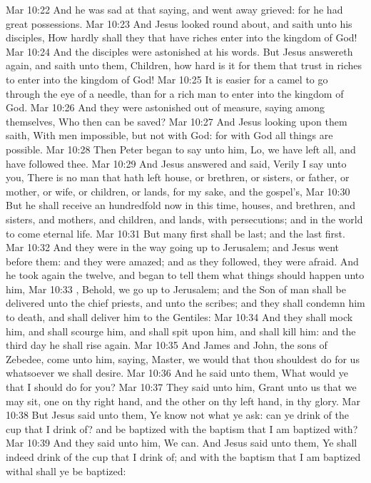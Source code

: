 \vs Mar 10:22 And he was sad at that saying, and went away grieved: for he had great possessions.
\vs Mar 10:23 And Jesus looked round about, and saith unto his disciples, How hardly shall they that have riches enter into the kingdom of God!
\vs Mar 10:24 And the disciples were astonished at his words. But Jesus answereth again, and saith unto them, Children, how hard is it for them that trust in riches to enter into the kingdom of God!
\vs Mar 10:25 It is easier for a camel to go through the eye of a needle, than for a rich man to enter into the kingdom of God.
\vs Mar 10:26 And they were astonished out of measure, saying among themselves, Who then can be saved?
\vs Mar 10:27 And Jesus looking upon them saith, With men  impossible, but not with God: for with God all things are possible.
\vs Mar 10:28 Then Peter began to say unto him, Lo, we have left all, and have followed thee.
\vs Mar 10:29 And Jesus answered and said, Verily I say unto you, There is no man that hath left house, or brethren, or sisters, or father, or mother, or wife, or children, or lands, for my sake, and the gospel's,
\vs Mar 10:30 But he shall receive an hundredfold now in this time, houses, and brethren, and sisters, and mothers, and children, and lands, with persecutions; and in the world to come eternal life.
\vs Mar 10:31 But many  first shall be last; and the last first.
\vs Mar 10:32 And they were in the way going up to Jerusalem; and Jesus went before them: and they were amazed; and as they followed, they were afraid. And he took again the twelve, and began to tell them what things should happen unto him,
\vs Mar 10:33 , Behold, we go up to Jerusalem; and the Son of man shall be delivered unto the chief priests, and unto the scribes; and they shall condemn him to death, and shall deliver him to the Gentiles:
\vs Mar 10:34 And they shall mock him, and shall scourge him, and shall spit upon him, and shall kill him: and the third day he shall rise again.
\vs Mar 10:35 And James and John, the sons of Zebedee, come unto him, saying, Master, we would that thou shouldest do for us whatsoever we shall desire.
\vs Mar 10:36 And he said unto them, What would ye that I should do for you?
\vs Mar 10:37 They said unto him, Grant unto us that we may sit, one on thy right hand, and the other on thy left hand, in thy glory.
\vs Mar 10:38 But Jesus said unto them, Ye know not what ye ask: can ye drink of the cup that I drink of? and be baptized with the baptism that I am baptized with?
\vs Mar 10:39 And they said unto him, We can. And Jesus said unto them, Ye shall indeed drink of the cup that I drink of; and with the baptism that I am baptized withal shall ye be baptized:
